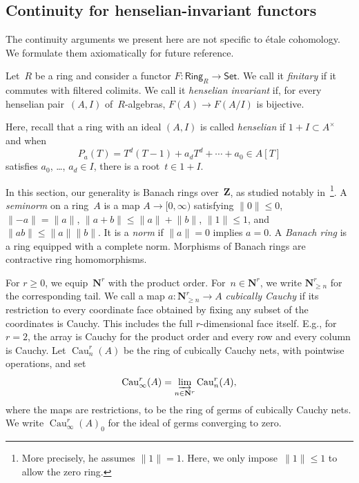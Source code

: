 \documentclass[11pt,a4paper]{amsart}
\renewcommand{\injlim}{\varinjlim}
\numberwithin{equation}{section}
\theoremstyle{plain}
\theoremstyle{definition}
\theoremstyle{remark}
\newcommand{\NN}{\mathbf{N}}
\newcommand{\ZZ}{\mathbf{Z}}
\newcommand{\Cau}{\operatorname{Cau}}
\newcommand{\Cat}[1]{\mathsf{#1}}
\begin{document}
\subsection{Continuity for henselian-invariant functors}\label{ss:rig}

The continuity arguments we present here
are not specific to étale cohomology.
We formulate them axiomatically for future reference.

\begin{definition}\label{henselian-invariant}
  Let~\(R\) be a ring
  and consider a functor \(F\colon\Cat{Ring}_{R}\to\Cat{Set}\).
  We call it \emph{finitary} if it commutes with filtered colimits.
  We call it \emph{henselian invariant}
  if, for every henselian pair~\((A,I)\) of~\(R\)-algebras,
  \(F(A)\to F(A/I)\) is bijective.
\end{definition}

Here, recall that a ring with an ideal \((A,I)\)
is called \emph{henselian}
if \(1+I\subset A^{\times}\) and
when
\begin{equation}
  \label{e:hensel}
  P_{a}(T)=T^{d}(T-1)+a_{d}T^{d}+\dotsb+a_{0}
  \in A[T]
\end{equation}
satisfies \(a_{0}\), \dots, \(a_{d}\in I\),
there is a root~\(t\in 1+I\).

In this section,
our generality is Banach rings over~\(\ZZ\),
as studied notably in~\cite[Section~1.1]{Berkovich90}\footnote{More precisely, he assumes \(\lVert1\rVert=1\).
  Here, we only impose~\(\lVert1\rVert\leq1\)
  to allow the zero ring.
}.
A \emph{seminorm} on a ring~\(A\)
is a map \(A\to[0,\infty)\)
satisfying
\(\lVert0\rVert\leq0\),
\(\lVert-a\rVert=\lVert a\rVert\),
\(\lVert a+b\rVert\leq\lVert a\rVert+\lVert b\rVert\),
\(\lVert1\rVert\leq1\),
and \(\lVert ab\rVert\leq\lVert a\rVert\lVert b\rVert\).
It is a \emph{norm} if \(\lVert a\rVert=0\) implies \(a=0\).
A \emph{Banach ring} is a ring equipped with a complete norm.
Morphisms of Banach rings are contractive ring homomorphisms.

\begin{definition}\label{cauchy-rings}
  For \(r\geq0\),
  we equip~\(\NN^{r}\) with the product order.
  For~\(n\in\NN^{r}\),
  we write \(\NN^{r}_{\geq n}\) for the corresponding tail.
  We call a map
  \(a\colon\NN^{r}_{\geq n}\to A\) \emph{cubically Cauchy}
  if its restriction to every coordinate face obtained
  by fixing any subset of the coordinates is Cauchy.
  This includes the full \(r\)-dimensional face itself.
  E.g., for \(r=2\), the array is Cauchy for the product order
  and every row and every column is Cauchy.
  Let \(\Cau^{r}_{n}(A)\) be the ring of cubically Cauchy nets,
  with pointwise operations, and set
  \begin{equation*}
    \Cau^{r}_{\infty}(A)=\injlim_{n\in\NN^{r}}\Cau^{r}_{n}(A),
  \end{equation*}
  where the maps are restrictions,
  to be the ring of germs of cubically Cauchy nets.
  We write \(\Cau^{r}_{\infty}(A)_{0}\)
  for the ideal of germs converging to zero.
\end{definition}
\end{document}
